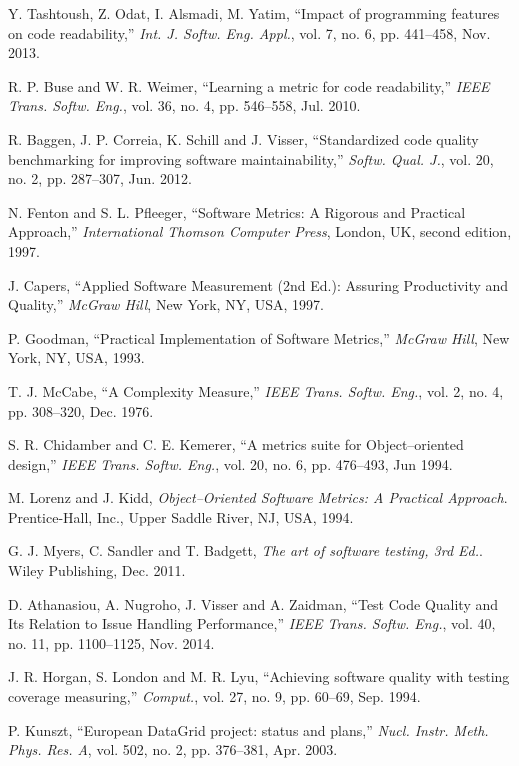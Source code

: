 \documentclass[journal]{IEEEtran}
\begin{document}
\begin{thebibliography}{1}
Y. Tashtoush, Z. Odat, I. Alsmadi, M. Yatim,
``Impact of programming features on code readability,''
\emph{Int. J. Softw. Eng. Appl.},
vol. 7, no. 6, pp. 441--458, Nov. 2013.

R. P. Buse and W. R. Weimer,
``Learning a metric for code readability,''
\emph{IEEE Trans. Softw. Eng.},
vol. 36, no. 4, pp. 546--558, Jul. 2010.

R. Baggen, J. P. Correia, K. Schill and J. Visser,
``Standardized code quality benchmarking for improving software maintainability,''
\emph{Softw. Qual. J.},
vol. 20, no. 2, pp. 287--307, Jun. 2012.

N. Fenton  and  S.  L.  Pfleeger,
``Software  Metrics:  A  Rigorous  and  Practical Approach,''
\emph{International Thomson Computer Press},
London, UK, second edition, 1997.

J. Capers,
``Applied Software Measurement (2nd Ed.): Assuring Productivity and Quality,''
\emph{McGraw Hill}, New York, NY, USA, 1997.

P. Goodman,
``Practical Implementation of Software Metrics,''
\emph{McGraw Hill}, New York, NY, USA, 1993.

T. J. McCabe,
``A Complexity Measure,''
\emph{IEEE Trans. Softw. Eng.},
vol. 2, no. 4, pp. 308--320, Dec. 1976.

S. R. Chidamber and C. E. Kemerer,
``A metrics suite for Object--oriented design,''
\emph{IEEE Trans. Softw. Eng.},
vol. 20, no. 6, pp. 476--493, Jun 1994.

M. Lorenz and J. Kidd,
\emph{Object--Oriented Software Metrics: A Practical Approach}.
Prentice-Hall, Inc., Upper Saddle River, NJ, USA, 1994.

G. J. Myers, C. Sandler and T. Badgett,
\emph{The art of software testing, 3rd Ed.}.
Wiley Publishing, Dec. 2011.

D. Athanasiou, A. Nugroho, J. Visser and A. Zaidman,
``Test Code Quality and Its Relation to Issue Handling Performance,''
\emph{IEEE Trans. Softw. Eng.},
vol. 40, no. 11, pp. 1100--1125, Nov. 2014.

J. R. Horgan, S. London and M. R. Lyu,
``Achieving software quality with testing coverage measuring,''
\emph{Comput.},
vol. 27, no. 9, pp. 60--69, Sep. 1994.

P. Kunszt,
``European DataGrid project: status and plans,''
\emph{Nucl. Instr. Meth. Phys. Res. A},
vol. 502, no. 2, pp. 376--381, Apr. 2003.


\end{thebibliography}
\end{document}
